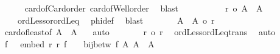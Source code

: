 \begin{isabellebody}
\ \ \ \ \isamarkupfalse%
\ card{\isacharunderscore}{\kern0pt}of{\isacharunderscore}{\kern0pt}Card{\isacharunderscore}{\kern0pt}order\ card{\isacharunderscore}{\kern0pt}of{\isacharunderscore}{\kern0pt}Well{\isacharunderscore}{\kern0pt}order\ \isamarkupfalse%
\ blast\isanewline
\ \ \ \ \isanewline
\ \ \ \ \isamarkupfalse%
\ {\isachardoublequoteopen}r\ {\isacharless}{\kern0pt}o\ {\isacharbar}{\kern0pt}{\isacharquery}{\kern0pt}A\ {\isasymtimes}\ {\isacharquery}{\kern0pt}A{\isacharbar}{\kern0pt}{\isachardoublequoteclose}\isanewline
\ \ \ \ \isamarkupfalse%
\ {}\ {}\ {}\ ordLess{\isacharunderscore}{\kern0pt}or{\isacharunderscore}{\kern0pt}ordLeq\ \isamarkupfalse%
\ phi{\isacharunderscore}{\kern0pt}def\ \isamarkupfalse%
\ blast\isanewline
\ \ \ \ \isamarkupfalse%
\ \isamarkupfalse%
\ {\isachardoublequoteopen}{\isacharbar}{\kern0pt}{\isacharquery}{\kern0pt}A\ {\isasymtimes}\ {\isacharquery}{\kern0pt}A{\isacharbar}{\kern0pt}\ {\isasymle}o\ {\isacharquery}{\kern0pt}r{\isacharprime}{\kern0pt}{\isachardoublequoteclose}\isanewline
\ \ \ \ \isamarkupfalse%
\ card{\isacharunderscore}{\kern0pt}of{\isacharunderscore}{\kern0pt}least{\isacharbrackleft}{\kern0pt}of\ {\isachardoublequoteopen}{\isacharquery}{\kern0pt}A\ {\isasymtimes}\ {\isacharquery}{\kern0pt}A{\isachardoublequoteclose}{\isacharbrackright}{\kern0pt}\ {}\ \isamarkupfalse%
\ auto\isanewline
\ \ \ \ \isamarkupfalse%
\ \isamarkupfalse%
\ {\isachardoublequoteopen}r\ {\isacharless}{\kern0pt}o\ {\isacharquery}{\kern0pt}r{\isacharprime}{\kern0pt}{\isachardoublequoteclose}\ \isamarkupfalse%
\ ordLess{\isacharunderscore}{\kern0pt}ordLeq{\isacharunderscore}{\kern0pt}trans\ \isamarkupfalse%
\ auto\isanewline
\ \ \ \ \isamarkupfalse%
\ \isamarkupfalse%
\ f\ \ {}{\isacharcolon}{\kern0pt}\ {\isachardoublequoteopen}embed\ r\ {\isacharquery}{\kern0pt}r{\isacharprime}{\kern0pt}\ f{\isachardoublequoteclose}\ \ {}{\isacharcolon}{\kern0pt}\ {\isachardoublequoteopen}{\isasymnot}\ bij{\isacharunderscore}{\kern0pt}betw\ f\ {\isacharquery}{\kern0pt}A\ {\isacharparenleft}{\kern0pt}{\isacharquery}{\kern0pt}A\ {\isasymtimes}\ {\isacharquery}{\kern0pt}A{\isacharparenright}{\kern0pt}{\isachardoublequoteclose}\isanewline
\ \ \ \ \isamarkupfalse%

\end{isabellebody}
